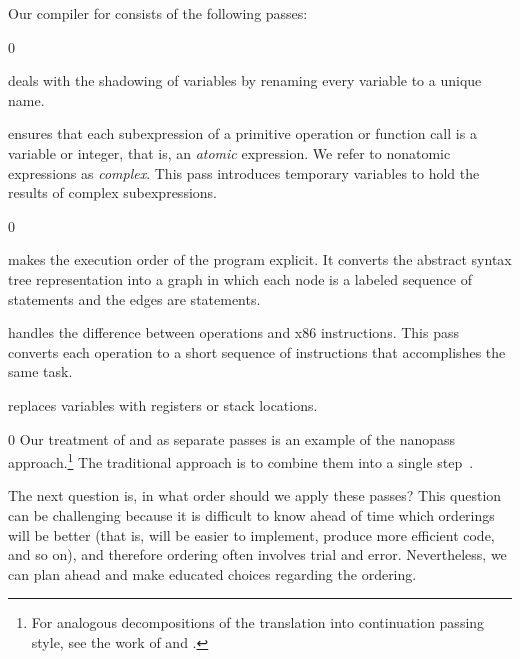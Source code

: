 \documentclass[7x10]{TimesAPriori_MIT}%
\def\racketEd{0}
\providecommand{\BookEdition}{1}
\let\edition\BookEdition
\numberwithin{theorem}{chapter}
\numberwithin{definition}{chapter}
\numberwithin{equation}{chapter}
\begin{document}
Our compiler for \LangVar{} consists of the following passes:
%
\begin{description}
{\if\edition\racketEd
\item[\key{uniquify}] deals with the shadowing of variables by
  renaming every variable to a unique name.
  \fi}

\item[\key{remove\_complex\_operands}] ensures that each subexpression
  of a primitive operation or function call is a variable or integer,
  that is, an \emph{atomic} expression. We refer to nonatomic
  expressions as \emph{complex}.  This pass introduces temporary
  variables to hold the results of complex
  subexpressions.%
  
{\if\edition\racketEd
\item[\key{explicate\_control}] makes the execution order of the
  program explicit. It converts the abstract syntax tree
  representation into a graph in which each node is a labeled sequence
  of statements and the edges are  statements.
\fi}

\item[\key{select\_instructions}]
  handles the difference between
  \LangVar{} operations and x86 instructions. This pass converts each
  \LangVar{} operation to a short sequence of instructions that
  accomplishes the same task.

\item[\key{assign\_homes}] replaces variables with registers or stack
  locations.
\end{description}
%
{\if\edition\racketEd
%
Our treatment of  and
 as separate passes is an example of the
nanopass approach.\footnote{For analogous decompositions of the
  translation into continuation passing style, see the work of
  \citet{Lawall:1993} and \citet{Hatcliff:1994ea}.} The traditional
approach is to combine them into a single step~\citep{Aho:2006wb}.
%  
\fi}

The next question is, in what order should we apply these passes? This
question can be challenging because it is difficult to know ahead of
time which orderings will be better (that is, will be easier to
implement, produce more efficient code, and so on), and therefore
ordering often involves trial and error. Nevertheless, we can plan
ahead and make educated choices regarding the ordering.
\end{document}
